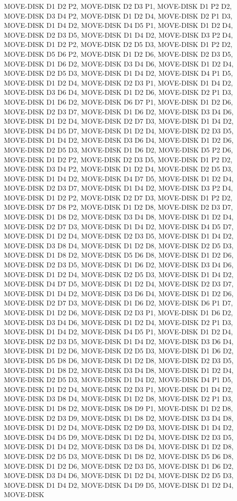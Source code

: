 \documentclass[12pt]{article}
\begin{document}
\begin{appendix}
\begin{itemize}
      \newline
 MOVE-DISK D1 D2 P2,  MOVE-DISK D2 D3 P1,  MOVE-DISK D1 P2 D2,  MOVE-DISK D3 D4 P2,  MOVE-DISK D1 D2 D4, MOVE-DISK D2 P1 D3,  MOVE-DISK D1 D4 D2,  MOVE-DISK D4 D5 P1,  MOVE-DISK D1 D2 D4,  MOVE-DISK D2 D3 D5,  MOVE-DISK D1 D4 D2,  MOVE-DISK D3 P2 D4,  MOVE-DISK D1 D2 P2,  MOVE-DISK D2 D5 D3,  MOVE-DISK D1 P2 D2,  MOVE-DISK D5 D6 P2,  MOVE-DISK D1 D2 D6,  MOVE-DISK D2 D3 D5,  MOVE-DISK D1 D6 D2,  MOVE-DISK D3 D4 D6,  MOVE-DISK D1 D2 D4,  MOVE-DISK D2 D5 D3,  MOVE-DISK D1 D4 D2,  MOVE-DISK D4 P1 D5,  MOVE-DISK D1 D2 D4,  MOVE-DISK D2 D3 P1,  MOVE-DISK D1 D4 D2,  MOVE-DISK D3 D6 D4,  MOVE-DISK D1 D2 D6,  MOVE-DISK D2 P1 D3,  MOVE-DISK D1 D6 D2,  MOVE-DISK D6 D7 P1,  MOVE-DISK D1 D2 D6,  MOVE-DISK D2 D3 D7,  MOVE-DISK D1 D6 D2,  MOVE-DISK D3 D4 D6,  MOVE-DISK D1 D2 D4,  MOVE-DISK D2 D7 D3,  MOVE-DISK D1 D4 D2,  MOVE-DISK D4 D5 D7,  MOVE-DISK D1 D2 D4,  MOVE-DISK D2 D3 D5,  MOVE-DISK D1 D4 D2,  MOVE-DISK D3 D6 D4,  MOVE-DISK D1 D2 D6,  MOVE-DISK D2 D5 D3,  MOVE-DISK D1 D6 D2,  MOVE-DISK D5 P2 D6,  MOVE-DISK D1 D2 P2,  MOVE-DISK D2 D3 D5,  MOVE-DISK D1 P2 D2,  MOVE-DISK D3 D4 P2,  MOVE-DISK D1 D2 D4,  MOVE-DISK D2 D5 D3,  MOVE-DISK D1 D4 D2,  MOVE-DISK D4 D7 D5,  MOVE-DISK D1 D2 D4,  MOVE-DISK D2 D3 D7,  MOVE-DISK D1 D4 D2,  MOVE-DISK D3 P2 D4,  MOVE-DISK D1 D2 P2,  MOVE-DISK D2 D7 D3,  MOVE-DISK D1 P2 D2,  MOVE-DISK D7 D8 P2,  MOVE-DISK D1 D2 D8,  MOVE-DISK D2 D3 D7,  MOVE-DISK D1 D8 D2,  MOVE-DISK D3 D4 D8,  MOVE-DISK D1 D2 D4,  MOVE-DISK D2 D7 D3,  MOVE-DISK D1 D4 D2,  MOVE-DISK D4 D5 D7,  MOVE-DISK D1 D2 D4,  MOVE-DISK D2 D3 D5,  MOVE-DISK D1 D4 D2,  MOVE-DISK D3 D8 D4,  MOVE-DISK D1 D2 D8,  MOVE-DISK D2 D5 D3,  MOVE-DISK D1 D8 D2,  MOVE-DISK D5 D6 D8,  MOVE-DISK D1 D2 D6,  MOVE-DISK D2 D3 D5,  MOVE-DISK D1 D6 D2,  MOVE-DISK D3 D4 D6,  MOVE-DISK D1 D2 D4,  MOVE-DISK D2 D5 D3,  MOVE-DISK D1 D4 D2,  MOVE-DISK D4 D7 D5,  MOVE-DISK D1 D2 D4,  MOVE-DISK D2 D3 D7,  MOVE-DISK D1 D4 D2,  MOVE-DISK D3 D6 D4,  MOVE-DISK D1 D2 D6,  MOVE-DISK D2 D7 D3,  MOVE-DISK D1 D6 D2,  MOVE-DISK D6 P1 D7,  MOVE-DISK D1 D2 D6,  MOVE-DISK D2 D3 P1,  MOVE-DISK D1 D6 D2,  MOVE-DISK D3 D4 D6,  MOVE-DISK D1 D2 D4,  MOVE-DISK D2 P1 D3,  MOVE-DISK D1 D4 D2,  MOVE-DISK D4 D5 P1,  MOVE-DISK D1 D2 D4,  MOVE-DISK D2 D3 D5,  MOVE-DISK D1 D4 D2,  MOVE-DISK D3 D6 D4,  MOVE-DISK D1 D2 D6,  MOVE-DISK D2 D5 D3,  MOVE-DISK D1 D6 D2,  MOVE-DISK D5 D8 D6,  MOVE-DISK D1 D2 D8,  MOVE-DISK D2 D3 D5,  MOVE-DISK D1 D8 D2,  MOVE-DISK D3 D4 D8,  MOVE-DISK D1 D2 D4,  MOVE-DISK D2 D5 D3,  MOVE-DISK D1 D4 D2,  MOVE-DISK D4 P1 D5,  MOVE-DISK D1 D2 D4,  MOVE-DISK D2 D3 P1,  MOVE-DISK D1 D4 D2,  MOVE-DISK D3 D8 D4,  MOVE-DISK D1 D2 D8,  MOVE-DISK D2 P1 D3,  MOVE-DISK D1 D8 D2,  MOVE-DISK D8 D9 P1,  MOVE-DISK D1 D2 D8,  MOVE-DISK D2 D3 D9,  MOVE-DISK D1 D8 D2,  MOVE-DISK D3 D4 D8,  MOVE-DISK D1 D2 D4,  MOVE-DISK D2 D9 D3,  MOVE-DISK D1 D4 D2,  MOVE-DISK D4 D5 D9,  MOVE-DISK D1 D2 D4,  MOVE-DISK D2 D3 D5,  MOVE-DISK D1 D4 D2,  MOVE-DISK D3 D8 D4,  MOVE-DISK D1 D2 D8,  MOVE-DISK D2 D5 D3,  MOVE-DISK D1 D8 D2,  MOVE-DISK D5 D6 D8,  MOVE-DISK D1 D2 D6,  MOVE-DISK D2 D3 D5,  MOVE-DISK D1 D6 D2,  MOVE-DISK D3 D4 D6,  MOVE-DISK D1 D2 D4,  MOVE-DISK D2 D5 D3,  MOVE-DISK D1 D4 D2,  MOVE-DISK D4 D9 D5,  MOVE-DISK D1 D2 D4,  MOVE-DISK 
\end{itemize}
\end{appendix}
\end{document}
